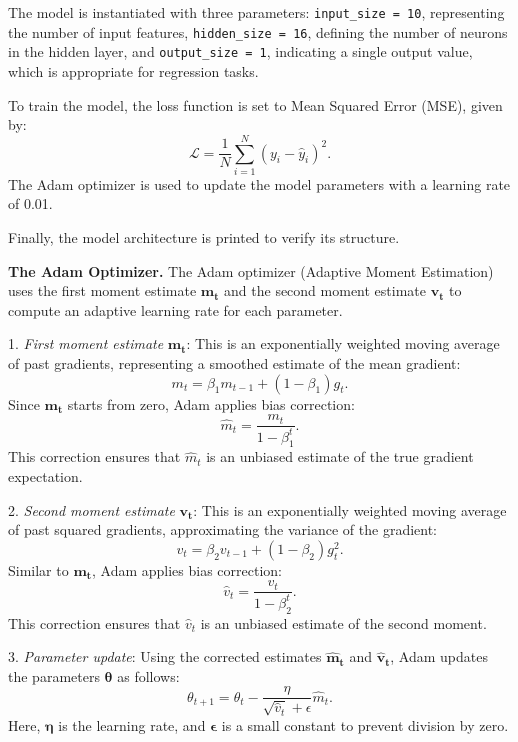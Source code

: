 The model is instantiated with three parameters: \texttt{input\_size = 10}, representing the number of input features, \texttt{hidden\_size = 16}, defining the number of neurons in the hidden layer, and \texttt{output\_size = 1}, indicating a single output value, which is appropriate for regression tasks.

To train the model, the loss function is set to Mean Squared Error (MSE), given by:
\begin{equation}
    \mathcal{L} = \frac{1}{N} \sum_{i=1}^{N} (y_i - \hat{y}_i)^2.
\end{equation}
The Adam optimizer is used to update the model parameters with a learning rate of 0.01.

Finally, the model architecture is printed to verify its structure.

{\bf The Adam Optimizer.}
The Adam optimizer (Adaptive Moment Estimation) uses the first moment estimate $\mathbf{m_t}$ and the second moment estimate $\mathbf{v_t}$ to compute an adaptive learning rate for each parameter.

1. {\em First moment estimate} $\mathbf{m_t}$: This is an exponentially weighted moving average of past gradients, representing a smoothed estimate of the mean gradient:
   \begin{equation}
       m_t = \beta_1 m_{t-1} + (1 - \beta_1) g_t.
   \end{equation}
   Since $\mathbf{m_t}$ starts from zero, Adam applies bias correction:
   \begin{equation}
       \hat{m}_t = \frac{m_t}{1 - \beta_1^t}.
   \end{equation}
   This correction ensures that $\hat{m}_t$ is an unbiased estimate of the true gradient expectation.

2. {\em Second moment estimate} $\mathbf{v_t}$: This is an exponentially weighted moving average of past squared gradients, approximating the variance of the gradient:
   \begin{equation}
       v_t = \beta_2 v_{t-1} + (1 - \beta_2) g_t^2.
   \end{equation}
   Similar to $\mathbf{m_t}$, Adam applies bias correction:
   \begin{equation}
       \hat{v}_t = \frac{v_t}{1 - \beta_2^t}.
   \end{equation}
   This correction ensures that $\hat{v}_t$ is an unbiased estimate of the second moment.

3. {\em Parameter update}: Using the corrected estimates $\mathbf{\hat{m}_t}$ and $\mathbf{\hat{v}_t}$, Adam updates the parameters $\mathbf{\theta}$ as follows:
   \begin{equation}
       \theta_{t+1} = \theta_t - \frac{\eta}{\sqrt{\hat{v}_t} + \epsilon} \hat{m}_t.
   \end{equation}
   Here, $\mathbf{\eta}$ is the learning rate, and $\mathbf{\epsilon}$ is a small constant to prevent division by zero.

